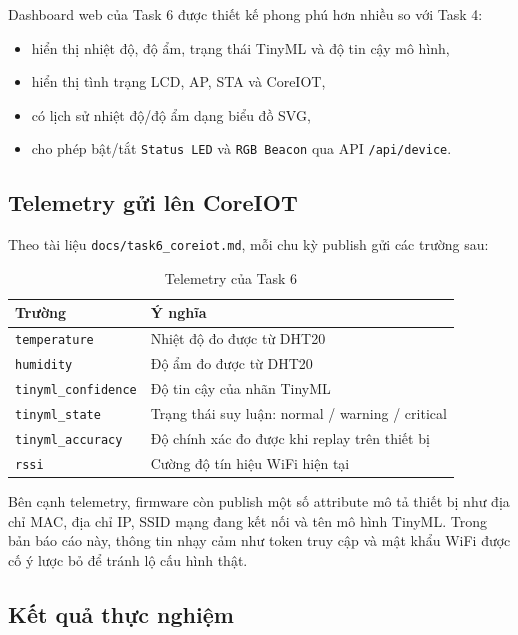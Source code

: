 \documentclass[12pt,a4paper]{article}
\begin{document}
Dashboard web của Task 6 được thiết kế phong phú hơn nhiều so với Task 4:
\begin{itemize}
  \item hiển thị nhiệt độ, độ ẩm, trạng thái TinyML và độ tin cậy mô hình,
  \item hiển thị tình trạng LCD, AP, STA và CoreIOT,
  \item có lịch sử nhiệt độ/độ ẩm dạng biểu đồ SVG,
  \item cho phép bật/tắt \texttt{Status LED} và \texttt{RGB Beacon} qua API \texttt{/api/device}.
\end{itemize}

\subsection{Telemetry gửi lên CoreIOT}

Theo tài liệu \texttt{docs/task6\_coreiot.md}, mỗi chu kỳ publish gửi các trường sau:

\begin{table}[H]
\centering
\caption{Telemetry của Task 6}
\begin{tabular}{>{\raggedright\arraybackslash}p{} >{\raggedright\arraybackslash}p{}}
\toprule
\textbf{Trường} & \textbf{Ý nghĩa} \\
\midrule
\texttt{temperature} & Nhiệt độ đo được từ DHT20 \\
\texttt{humidity} & Độ ẩm đo được từ DHT20 \\
\texttt{tinyml\_confidence} & Độ tin cậy của nhãn TinyML \\
\texttt{tinyml\_state} & Trạng thái suy luận: normal / warning / critical \\
\texttt{tinyml\_accuracy} & Độ chính xác đo được khi replay trên thiết bị \\
\texttt{rssi} & Cường độ tín hiệu WiFi hiện tại \\
\bottomrule
\end{tabular}
\end{table}

Bên cạnh telemetry, firmware còn publish một số attribute mô tả thiết bị như địa chỉ MAC, địa chỉ IP, SSID mạng đang kết nối và tên mô hình TinyML. Trong bản báo cáo này, thông tin nhạy cảm như token truy cập và mật khẩu WiFi được cố ý lược bỏ để tránh lộ cấu hình thật.

\subsection{Kết quả thực nghiệm}
\end{document}
